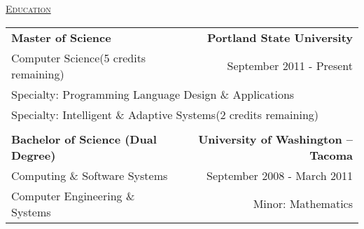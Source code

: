 \documentclass[letterpaper]{article}
\begin{document}
\begin{center}
		\underline{\large \scshape Education} \\
		\begin{tabular}{p{}r}
				\textbf{Master of Science}							&
				\textbf{Portland State University}
			\\
				Computer Science\quad(5 credits remaining)				&
				September 2011 - Present
			\\
				\multicolumn{2}{p{\textwidth}}{Specialty: Programming Language Design \& Applications}
			\\	
				\multicolumn{2}{p{\textwidth}}{Specialty: Intelligent \& Adaptive Systems\quad(2 credits remaining)}
				
			\\
			\\
				\textbf{Bachelor of Science (Dual Degree)}			&
				\textbf{University of Washington -- Tacoma}
			\\
				Computing \& Software Systems						&
				September 2008 - March 2011
			\\
				Computer Engineering \& Systems						&
				Minor: Mathematics
		\end{tabular}
	\end{center} 
\end{document}
